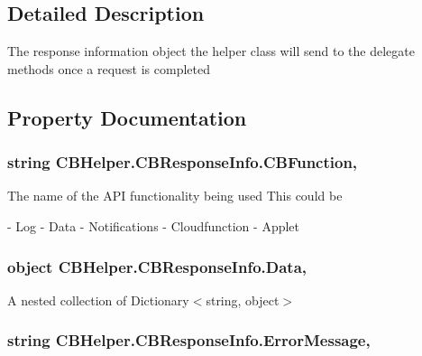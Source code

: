 \subsection{Detailed Description}
The response information object the helper class will send to the delegate methods once a request is completed 



\subsection{Property Documentation}
\subsubsection[{C\-B\-Function}]{\setlength{\rightskip}{0pt plus 5cm}string C\-B\-Helper.\-C\-B\-Response\-Info.\-C\-B\-Function\hspace{0.3cm}{\ttfamily [get]}, {\ttfamily [set]}}\label{class_c_b_helper_1_1_c_b_response_info_a183aeb8ad181df4c9e471b615f400b2d}


The name of the A\-P\-I functionality being used This could be 

\begin{DoxyVerb}- Log
- Data
- Notifications
- Cloudfunction
- Applet
\end{DoxyVerb}
\subsubsection[{Data}]{\setlength{\rightskip}{0pt plus 5cm}object C\-B\-Helper.\-C\-B\-Response\-Info.\-Data\hspace{0.3cm}{\ttfamily [get]}, {\ttfamily [set]}}\label{class_c_b_helper_1_1_c_b_response_info_a7056bee374e6655757e8ba73e4245290}


A nested collection of Dictionary$<$string, object$>$ 

\subsubsection[{Error\-Message}]{\setlength{\rightskip}{0pt plus 5cm}string C\-B\-Helper.\-C\-B\-Response\-Info.\-Error\-Message\hspace{0.3cm}{\ttfamily [get]}, {\ttfamily [set]}}\label{class_c_b_helper_1_1_c_b_response_info_ab31ee3c7a20b430a604b56965f8809a9}


